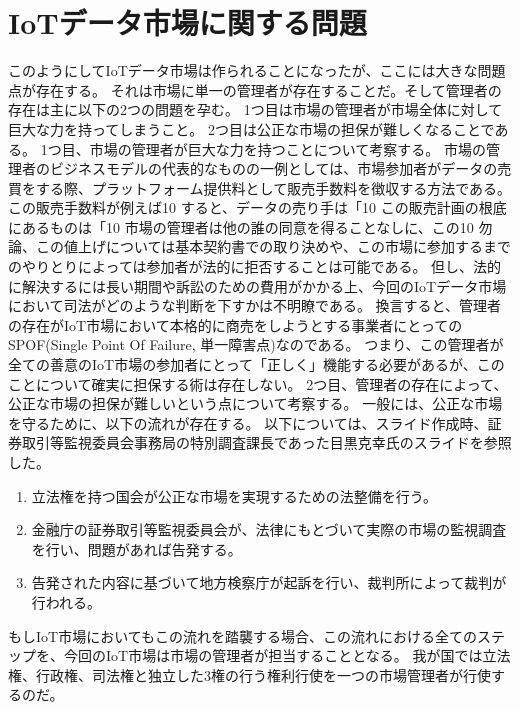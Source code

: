 \section{IoTデータ市場に関する問題}
このようにしてIoTデータ市場は作られることになったが、ここには大きな問題点が存在する。
それは市場に単一の管理者が存在することだ。そして管理者の存在は主に以下の2つの問題を孕む。
1つ目は市場の管理者が市場全体に対して巨大な力を持ってしまうこと。
2つ目は公正な市場の担保が難しくなることである。
1つ目、市場の管理者が巨大な力を持つことについて考察する。
市場の管理者のビジネスモデルの代表的なものの一例としては、市場参加者がデータの売買をする際、プラットフォーム提供料として販売手数料を徴収する方法である。
この販売手数料が例えば10%
すると、データの売り手は「10%
この販売計画の根底にあるものは「10%
市場の管理者は他の誰の同意を得ることなしに、この10%
勿論、この値上げについては基本契約書での取り決めや、この市場に参加するまでのやりとりによっては参加者が法的に拒否することは可能である。
但し、法的に解決するには長い期間や訴訟のための費用がかかる上、今回のIoTデータ市場において司法がどのような判断を下すかは不明瞭である。
換言すると、管理者の存在がIoT市場において本格的に商売をしようとする事業者にとってのSPOF(Single Point Of Failure, 単一障害点)なのである。
つまり、この管理者が全ての善意のIoT市場の参加者にとって「正しく」機能する必要があるが、このことについて確実に担保する術は存在しない。
2つ目、管理者の存在によって、公正な市場の担保が難しいという点について考察する。
一般には、公正な市場を守るために、以下の流れが存在する。
以下については、スライド作成時、証券取引等監視委員会事務局の特別調査課長であった目黒克幸氏のスライド\cite{kousei_torihiki}を参照した。
\begin{enumerate}
\item 立法権を持つ国会が公正な市場を実現するための法整備を行う。
\item 金融庁の証券取引等監視委員会が、法律にもとづいて実際の市場の監視調査を行い、問題があれば告発する。
\item 告発された内容に基づいて地方検察庁が起訴を行い、裁判所によって裁判が行われる。
\end{enumerate}
もしIoT市場においてもこの流れを踏襲する場合、この流れにおける全てのステップを、今回のIoT市場は市場の管理者が担当することとなる。
我が国では立法権、行政権、司法権と独立した3権の行う権利行使を一つの市場管理者が行使するのだ。
